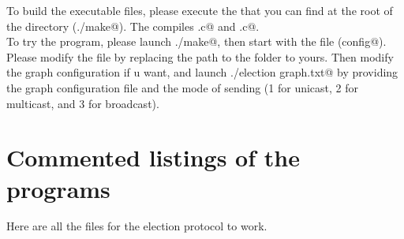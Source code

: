 \documentclass{article}
\begin{document}
To build the executable files, please execute the \verb@makefile@ that you can find at the root of the directory (\verb@./make@). The \verb@makefile@ compiles \verb@election.c@ and \verb@node.c@.\\

To try the program, please launch \verb@./make@, then start \verb@pvm@ with the \verb@config@ file (\verb@pvm config@). Please modify the \verb@config@ file by replacing the path to the \verb@code@ folder to yours. Then modify the graph configuration if u want, and launch \verb@./election graph.txt@ by providing the graph configuration file and the mode of sending (1 for unicast, 2 for multicast, and 3 for broadcast).

\section{Commented listings of the programs}
Here are all the files for the election protocol to work.






\end{document}
